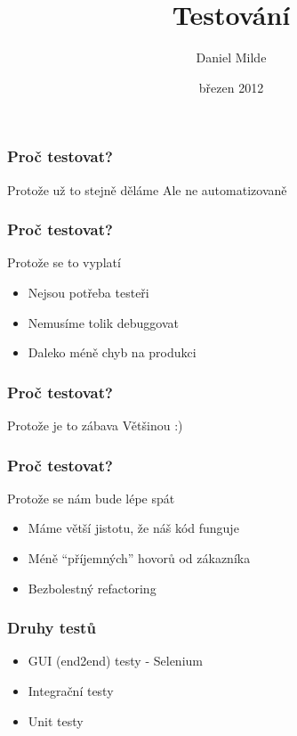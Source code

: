 \documentclass{beamer}
\title {Testování}
\subtitle {}
\author {Daniel Milde}
\date {březen 2012}
\institute[medio]
{
  \inst{}
  Medio Interactive
}
\begin{document}
	\begin{frame}
		\titlepage
	\end{frame}
	
	\begin{frame}
		\frametitle{Proč testovat?}
		\begin{block}{Protože už to stejně děláme}
			Ale ne automatizovaně
		\end{block}
	\end{frame}

	\begin{frame}
		\frametitle{Proč testovat?}
		\begin{block}{Protože se to vyplatí}
			\begin{itemize}
				\item Nejsou potřeba testeři
				\item Nemusíme tolik debuggovat
				\item Daleko méně chyb na produkci
			\end{itemize}
		\end{block}
	\end{frame}
	
	\begin{frame}
		\frametitle{Proč testovat?}
		\begin{block}{Protože je to zábava}
			Většinou :)
		\end{block}
	\end{frame}

	\begin{frame}
		\frametitle{Proč testovat?}
		\begin{block}{Protože se nám bude lépe spát}
			\begin{itemize}
				\item Máme větší jistotu, že náš kód funguje
				\item Méně  ``příjemných'' hovorů od zákazníka
				\item Bezbolestný refactoring
			\end{itemize}
		\end{block}
	\end{frame}
	
	\begin{frame}
		\frametitle{Druhy testů}
		\begin{block}{}
			\begin{itemize}
				\item GUI (end2end) testy - Selenium
				\item Integrační testy
				\item Unit testy
			\end{itemize}
		\end{block}
	\end{frame}
\end{document}
